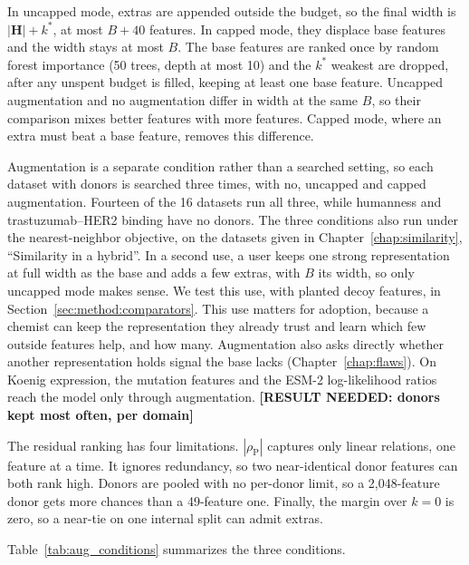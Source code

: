 In uncapped mode, extras are appended outside the budget, so the final width is $|\mathbf{H}| + k^*$, at most $B + 40$ features. In capped mode, they displace base features and the width stays at most $B$. The base features are ranked once by random forest importance (50 trees, depth at most 10) and the $k^*$ weakest are dropped, after any unspent budget is filled, keeping at least one base feature. Uncapped augmentation and no augmentation differ in width at the same $B$, so their comparison mixes better features with more features. Capped mode, where an extra must beat a base feature, removes this difference.

Augmentation is a separate condition rather than a searched setting, so each dataset with donors is searched three times, with no, uncapped and capped augmentation. Fourteen of the 16 datasets run all three, while humanness and trastuzumab--HER2 binding have no donors. The three conditions also run under the nearest-neighbor objective, on the datasets given in Chapter~\ref{chap:similarity}, ``Similarity in a hybrid''. In a second use, a user keeps one strong representation at full width as the base and adds a few extras, with $B$ its width, so only uncapped mode makes sense. We test this use, with planted decoy features, in Section~\ref{sec:method:comparators}. This use matters for adoption, because a chemist can keep the representation they already trust and learn which few outside features help, and how many. Augmentation also asks directly whether another representation holds signal the base lacks (Chapter~\ref{chap:flaws}). On Koenig expression, the mutation features and the ESM-2 log-likelihood ratios reach the model only through augmentation. \textbf{[RESULT NEEDED: donors kept most often, per domain]}

The residual ranking has four limitations. $|\rho_{\mathrm{P}}|$ captures only linear relations, one feature at a time. It ignores redundancy, so two near-identical donor features can both rank high. Donors are pooled with no per-donor limit, so a 2,048-feature donor gets more chances than a 49-feature one. Finally, the margin over $k=0$ is zero, so a near-tie on one internal split can admit extras.

Table~\ref{tab:aug_conditions} summarizes the three conditions.

